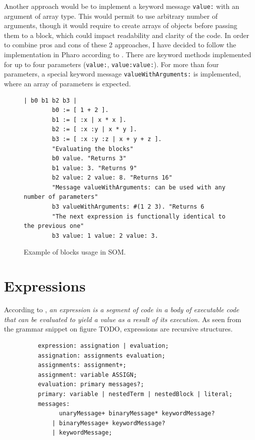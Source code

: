 \documentclass[thesis=M,english]{FITthesis}[2019/12/23]
\begin{document}
Another approach would be to implement a keyword message \texttt{value:} with an argument of array type. This would
permit to use arbitrary number of arguments, though it would require to create arrays of objects before passing them
to a block, which could impact readability and clarity of the code. In order to combine pros and cons of these 2
approaches, I have decided to follow the implementation in Pharo according to \cite[p.~65]{pharo-by-example}. 
There are keyword methods implemented for up to four parameters (\texttt{value:}, \texttt{value:value:}). For more
than four parameters, a special keyword message \texttt{valueWithArguments:} is implemented, where an array of
parameters is expected.

\begin{figure}
	\caption{Example of blocks usage in SOM.}
	\begin{lstlisting}[language=Smalltalk]
		| b0 b1 b2 b3 |
		b0 := [ 1 + 2 ].
		b1 := [ :x | x * x ].
		b2 := [ :x :y | x * y ].
		b3 := [ :x :y :z | x + y + z ].
		"Evaluating the blocks"
		b0 value. "Returns 3"
		b1 value: 3. "Returns 9"
		b2 value: 2 value: 8. "Returns 16"
		"Message valueWithArguments: can be used with any number of parameters"
		b3 valueWithArguments: #(1 2 3). "Returns 6
		"The next expression is functionally identical to the previous one"
		b3 value: 1 value: 2 value: 3.
	\end{lstlisting}
\end{figure}

\section{Expressions}
According to \cite{smalltalk-essentials}, \textit{an expression is a segment of code in a body of executable code
that can be evaluated to yield a value as a result of its execution.} As seen from the grammar snippet on figure
TODO, expressions are recursive structures.

\begin{figure}
	\begin{verbatim}
	expression: assignation | evaluation;
	assignation: assignments evaluation;
	assignments: assignment+;
	assignment: variable ASSIGN;
	evaluation: primary messages?;
	primary: variable | nestedTerm | nestedBlock | literal;
	messages:
		  unaryMessage+ binaryMessage* keywordMessage?
		| binaryMessage+ keywordMessage?
		| keywordMessage;
	\end{verbatim}
\end{figure}
\end{document}
